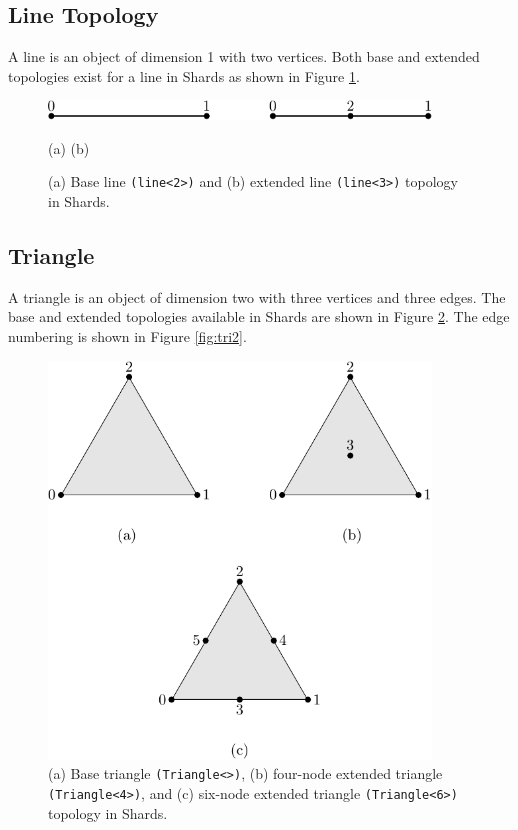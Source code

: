 \documentclass[pdf,12pt,relaxed]{SANDreport}
\begin{document}
\subsection{Line Topology}

 A line is an object of dimension 1 with two vertices. Both base and extended topologies exist for a line in Shards as shown in Figure \ref{fig:line}.

 \begin{figure}[ht]
   \begin{center}
     \includegraphics[width=4.0in]{topo_figs/line.pdf}%
     \end{center}
  \begin{center}  (a) \hspace{5cm} (b) \end{center}
  \caption{(a) Base line {\tt (line<2>)} and (b) extended line {\tt (line<3>)} topology in Shards.}
  \label{fig:line}
 \end{figure}

\subsection{Triangle}

A triangle is an object of dimension two with three vertices and three edges. The base and extended topologies available in Shards are shown in Figure \ref{fig:tri1}. The edge numbering is shown in Figure \ref{fig:tri2}.

\begin{figure}[ht]
  \begin{center}
     \includegraphics[width=4.0in]{topo_figs/tri_node.pdf}%
  \caption{(a) Base triangle {\tt (Triangle<>)}, (b) four-node extended triangle {\tt (Triangle<4>)},  and (c) six-node extended triangle {\tt (Triangle<6>)} topology in Shards.} 
  \end{center}
 \label{fig:tri1}
\end{figure}
\end{document}
